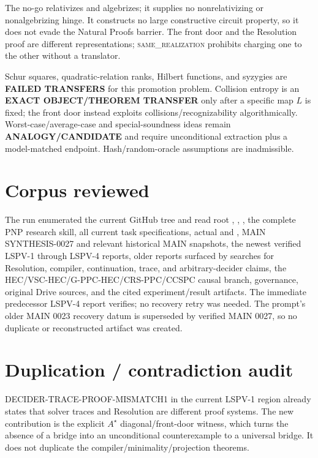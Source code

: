 \documentclass[11pt]{article}
\newcommand{\same}{\textsc{same\_realization}}
\begin{document}
The no-go relativizes and algebrizes; it supplies no nonrelativizing or
nonalgebrizing hinge.  It constructs no large constructive circuit property,
so it does not evade the Natural Proofs barrier.  The front door and the
Resolution proof are different representations; \same{} prohibits charging
one to the other without a translator.

Schur squares, quadratic-relation ranks, Hilbert functions, and syzygies are
\textbf{FAILED TRANSFERS} for this promotion problem.  Collision entropy is an
\textbf{EXACT OBJECT/THEOREM TRANSFER} only after a specific map $L$ is fixed;
the front door instead exploits collisions/recognizability algorithmically.
Worst-case/average-case and special-soundness ideas remain
\textbf{ANALOGY/CANDIDATE} and require unconditional extraction plus a
model-matched endpoint.  Hash/random-oracle assumptions are inadmissible.

\section{Corpus reviewed}

The run enumerated the current GitHub tree and read root ,
, , the complete PNP research skill, all current
task specifications, actual  and , MAIN
SYNTHESIS-0027 and relevant historical MAIN snapshots, the newest verified
LSPV-1 through LSPV-4 reports, older reports surfaced by searches for
Resolution, compiler, continuation, trace, and arbitrary-decider claims, the
HEC/VSC-HEC/G-PPC-HEC/CRS-PPC/CCSPC causal branch, governance, original Drive
sources, and the cited experiment/result artifacts.  The immediate predecessor
LSPV-4 report verifies; no recovery retry was needed.  The prompt's older MAIN
0023 recovery datum is superseded by verified MAIN 0027, so no duplicate or
reconstructed artifact was created.

\section{Duplication / contradiction audit}

DECIDER-TRACE-PROOF-MISMATCH1 in the current LSPV-1 region already states that
solver traces and Resolution are different proof systems.  The new contribution
is the explicit $A^\star$ diagonal/front-door witness, which turns the absence
of a bridge into an unconditional counterexample to a universal bridge.  It
does not duplicate the compiler/minimality/projection theorems.
\end{document}
